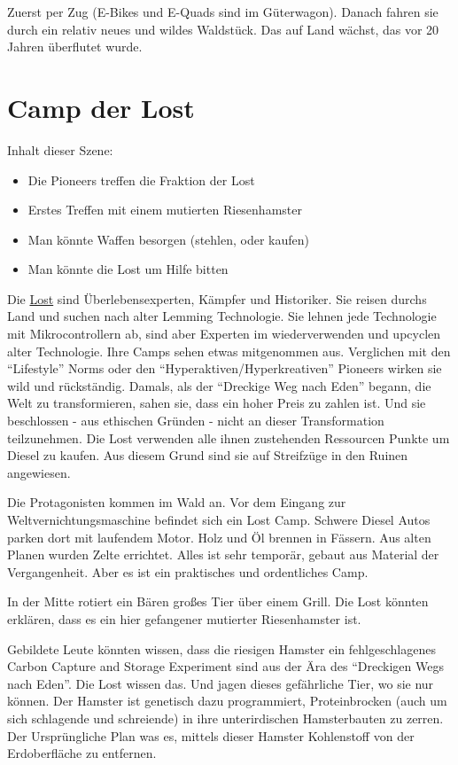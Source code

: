 Zuerst per Zug (E-Bikes und E-Quads sind im Güterwagon). Danach fahren sie durch ein relativ neues und wildes Waldstück. Das auf Land wächst, das vor 20 Jahren überflutet wurde.

\section{Camp der Lost}

Inhalt dieser Szene:

\begin{itemize}
\item Die Pioneers treffen die Fraktion der Lost
\item Erstes Treffen mit einem mutierten Riesenhamster
\item Man könnte Waffen besorgen (stehlen, oder kaufen)
\item Man könnte die Lost um Hilfe bitten
\end{itemize}

\begin{sidebarBox}[title=Die Lost]
Die \hyperref[sec:Lost]{Lost} sind Überlebensexperten, Kämpfer und Historiker. Sie reisen durchs Land und suchen nach alter Lemming Technologie. Sie lehnen jede Technologie mit Mikrocontrollern ab, sind aber Experten im wiederverwenden und upcyclen alter Technologie. Ihre Camps sehen etwas mitgenommen aus. Verglichen mit den \enquote{Lifestyle} Norms oder den \enquote{Hyperaktiven/Hyperkreativen} Pioneers wirken sie wild und rückständig.
Damals, als der \enquote{Dreckige Weg nach Eden} begann, die Welt zu transformieren, sahen sie, dass ein hoher Preis zu zahlen ist. Und sie beschlossen - aus ethischen Gründen - nicht an dieser Transformation teilzunehmen.
Die Lost verwenden alle ihnen zustehenden Ressourcen Punkte um Diesel zu kaufen. Aus diesem Grund sind sie auf Streifzüge in den Ruinen angewiesen.
\end{sidebarBox}

Die Protagonisten kommen im Wald an. Vor dem Eingang zur Weltvernichtungsmaschine befindet sich ein Lost Camp. Schwere Diesel Autos parken dort mit laufendem Motor. Holz und Öl brennen in Fässern. Aus alten Planen wurden Zelte errichtet. Alles ist sehr temporär, gebaut aus Material der Vergangenheit. Aber es ist ein praktisches und ordentliches Camp.

In der Mitte rotiert ein Bären großes Tier über einem Grill. Die Lost könnten erklären, dass es ein hier gefangener mutierter Riesenhamster ist.

\begin{sidebarBox}[title=Fehlgeschlagenes CCS Experiment: Monsterhamster]
Gebildete Leute könnten wissen, dass die riesigen Hamster ein fehlgeschlagenes Carbon Capture and Storage Experiment sind aus der Ära des \enquote{Dreckigen Wegs nach Eden}. Die Lost wissen das. Und jagen dieses gefährliche Tier, wo sie nur können. Der Hamster ist genetisch dazu programmiert, Proteinbrocken (auch um sich schlagende und schreiende) in ihre unterirdischen Hamsterbauten zu zerren. Der Ursprüngliche Plan was es, mittels dieser Hamster Kohlenstoff von der Erdoberfläche zu entfernen.
\end{sidebarBox}

